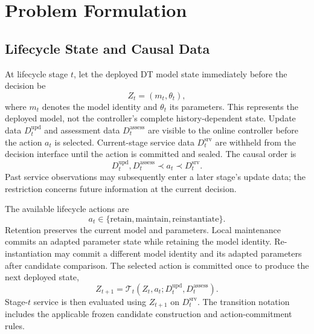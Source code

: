 \documentclass[journal]{IEEEtran}
\begin{document}
\section{Problem Formulation}
\subsection{Lifecycle State and Causal Data}
At lifecycle stage $t$, let the deployed DT model state immediately
before the decision be
\begin{equation}
Z_t=(m_t,\theta_t),
\end{equation}
where $m_t$ denotes the model identity and $\theta_t$ its parameters.
This represents the deployed model, not the controller's complete
history-dependent state. Update data $D_t^{\mathrm{upd}}$ and assessment
data $D_t^{\mathrm{assess}}$ are visible to the online controller before
the action $a_t$ is selected. Current-stage service data
$D_t^{\mathrm{srv}}$ are withheld from the decision interface until
the action is committed and sealed. The causal order is
\begin{equation}
D_t^{\mathrm{upd}},D_t^{\mathrm{assess}}
\prec a_t\prec D_t^{\mathrm{srv}}.
\end{equation}
Past service observations may subsequently enter a later stage's
update data; the restriction concerns future information at the
current decision.

The available lifecycle actions are
\begin{equation}
a_t\in\{\mathrm{retain},\mathrm{maintain},\mathrm{reinstantiate}\}.
\end{equation}
Retention preserves the current model and parameters. Local maintenance
commits an adapted parameter state while retaining the model identity.
Re-instantiation may commit a different model identity and its adapted
parameters after candidate comparison. The selected action is
committed once to produce the next deployed state,
\begin{equation}
Z_{t+1}=\mathcal T_t(Z_t,a_t;D_t^{\mathrm{upd}},D_t^{\mathrm{assess}}).
\end{equation}
Stage-$t$ service is then evaluated using $Z_{t+1}$ on
$D_t^{\mathrm{srv}}$. The transition notation includes the applicable
frozen candidate construction and action-commitment rules.
\end{document}

